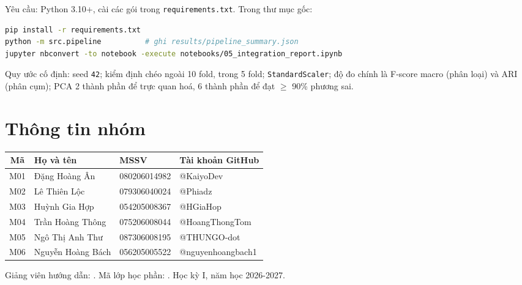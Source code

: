 Yêu cầu: Python 3.10+, cài các gói trong \texttt{requirements.txt}. Trong thư mục gốc:

\begin{lstlisting}[language=bash, numbers=none]
pip install -r requirements.txt
python -m src.pipeline          # ghi results/pipeline_summary.json
jupyter nbconvert -to notebook -execute notebooks/05_integration_report.ipynb
\end{lstlisting}

Quy ước cố định: seed \texttt{42}; kiểm định chéo ngoài 10 fold, trong 5 fold;
\texttt{StandardScaler}; độ đo chính là F-score macro (phân loại) và ARI (phân cụm);
PCA 2 thành phần để trực quan hoá, 6 thành phần để đạt $\ge$ 90\% phương sai.

\section{Thông tin nhóm}

\begin{table}[H]
\centering
\begin{tabular}{|c|l|l|l|}
\hline
\textbf{Mã} & \textbf{Họ và tên} & \textbf{MSSV} & \textbf{Tài khoản GitHub} \\
\hline
M01 & Đặng Hoàng Ân   & 080206014982 & @KaiyoDev \\
\hline
M02 & Lê Thiên Lộc    & 079306040024 & @Phiadz \\
\hline
M03 & Huỳnh Gia Hợp    & 054205008367 & @HGiaHop \\
\hline
M04 & Trần Hoàng Thông & 075206008044 & @HoangThongTom \\
\hline
M05 & Ngô Thị Anh Thư   & 087306008195 & @THUNGO-dot \\
\hline
M06 & Nguyễn Hoàng Bách & 056205005522 & @nguyenhoangbach1 \\
\hline
\end{tabular}
\end{table}

Giảng viên hướng dẫn: \textbf{\InstructorName}. Mã lớp học phần: \textbf{\ClassCode}.
Học kỳ I, năm học 2026-2027.
